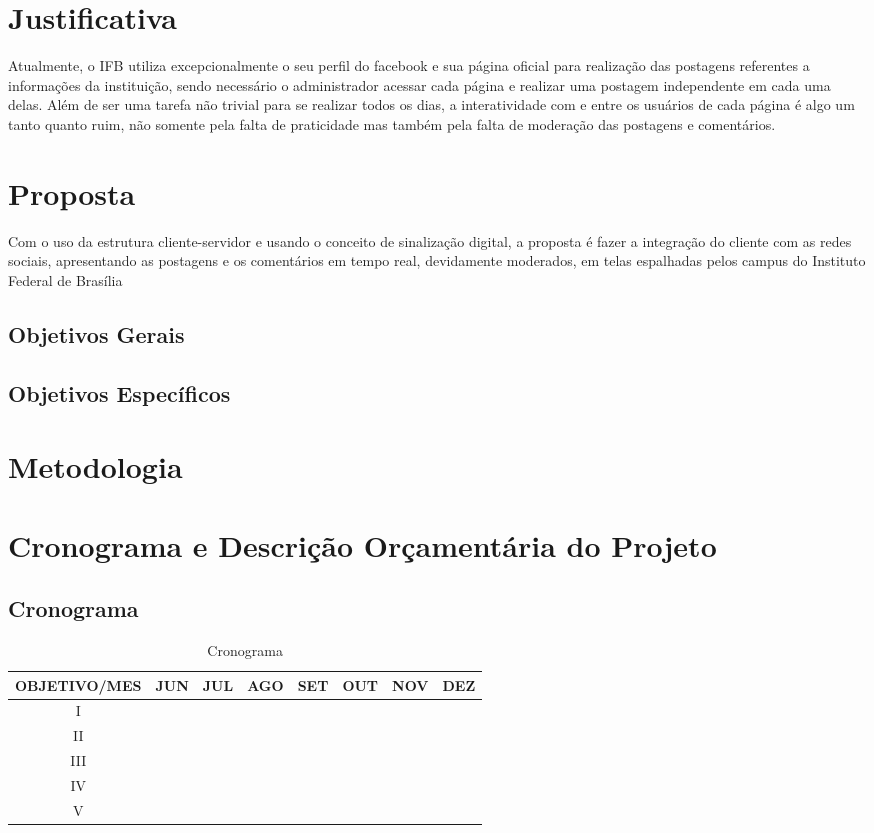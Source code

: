 \documentclass[
	12pt,				%
	openright,			%
	oneside,			%
	a4paper,			%
	english,			%
	french,				%
	spanish,			%
	brazil,				%
	]{abntex2}
\begin{document}
\section*{Justificativa}
	Atualmente, o IFB utiliza excepcionalmente o seu perfil do facebook e sua página oficial para realização das postagens referentes a informações da instituição, sendo necessário o administrador acessar cada página e realizar uma postagem independente em cada uma delas. Além de ser uma tarefa não trivial para se realizar todos os dias, a interatividade com e entre os usuários de cada página é algo um tanto quanto ruim, não somente pela falta de praticidade mas também pela falta de moderação das postagens e comentários.
	
\section*{Proposta}
	Com o uso da estrutura cliente-servidor e usando o conceito de sinalização digital, a proposta é fazer a integração do cliente com as redes sociais, apresentando as postagens e os comentários em tempo real, devidamente moderados, em telas espalhadas pelos campus do Instituto Federal de Brasília
	
\subsection*{Objetivos Gerais}
\subsection*{Objetivos Específicos}
\section*{Metodologia}
\section*{Cronograma e Descrição Orçamentária do Projeto}
\subsection*{Cronograma}

	\begin{table}[]
		\centering
		\caption{Cronograma}
		\label{my-label}
		\begin{tabular}{|c|c|c|c|c|c|c|c|}
			\hline
			OBJETIVO/MES & JUN & JUL & AGO & SET & OUT & NOV & DEZ \\ \hline
			I &  & & & & & & \\ \hline
			II &  & & & & & & \\ \hline
			III &  & & & & & & \\ \hline
			IV &  & & & & & & \\ \hline
			V &  & & & & & & \\ \hline
		\end{tabular}
	\end{table}


\end{document}

